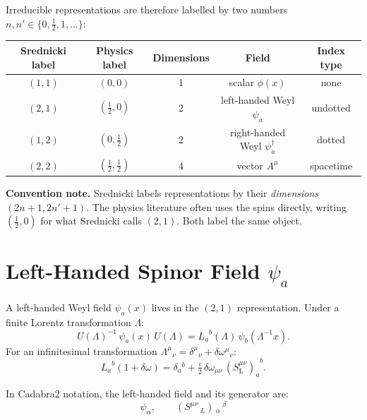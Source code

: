 \documentclass[12pt]{article}
\newcommand{\psidag}{\psi^{\dagger}}
\begin{document}
Irreducible representations are therefore labelled by two numbers
$n, n' \in \{0, \tfrac{1}{2}, 1, \ldots\}$:

\medskip
\begin{center}
\begin{tabular}{@{}ccccc@{}}
  \toprule
  Srednicki label & Physics label & Dimensions & Field & Index type \\
  \midrule
  $(1,1)$ & $(0,0)$ & 1 & scalar $\phi(x)$ & none \\
  $(2,1)$ & $(\tfrac{1}{2},0)$ & 2 & left-handed Weyl $\psi_a$ & undotted \\
  $(1,2)$ & $(0,\tfrac{1}{2})$ & 2 & right-handed Weyl $\psidag_{\dot{a}}$ & dotted \\
  $(2,2)$ & $(\tfrac{1}{2},\tfrac{1}{2})$ & 4 & vector $A^\mu$ & spacetime \\
  \bottomrule
\end{tabular}
\end{center}
\medskip

\noindent\textbf{Convention note.}  Srednicki labels representations by their
\emph{dimensions} $(2n{+}1, 2n'{+}1)$.  The physics literature often uses
the spins directly, writing $(\tfrac{1}{2},0)$ for what Srednicki calls $(2,1)$.
Both label the same object.

\section{Left-Handed Spinor Field \texorpdfstring{$\psi_a$}{psi\_a}}

A left-handed Weyl field $\psi_a(x)$ lives in the $(2,1)$ representation.
Under a finite Lorentz transformation $\Lambda$:
\begin{equation}
  U(\Lambda)^{-1}\,\psi_a(x)\,U(\Lambda)
  = {L_a}^b(\Lambda)\,\psi_b(\Lambda^{-1}x).
  \tag{34.1}
\end{equation}
For an infinitesimal transformation
${\Lambda^\mu}{}_\nu = \delta^\mu{}_\nu + \delta\omega^\mu{}_\nu$:
\begin{equation}
  {L_a}^b(1{+}\delta\omega)
  = \delta_a{}^b + \tfrac{i}{2}\,\delta\omega_{\mu\nu}\,
    {(S^{\mu\nu}_{\mathrm{L}})_a}^b.
  \tag{34.3}
\end{equation}

\noindent In Cadabra2 notation, the left-handed field and its generator are:
\[
  \psi_{\alpha},
  \qquad
  \left(S^{\mu \nu}\,_{L} \right)\,_{\alpha}\,^{\beta}
\]
\end{document}
